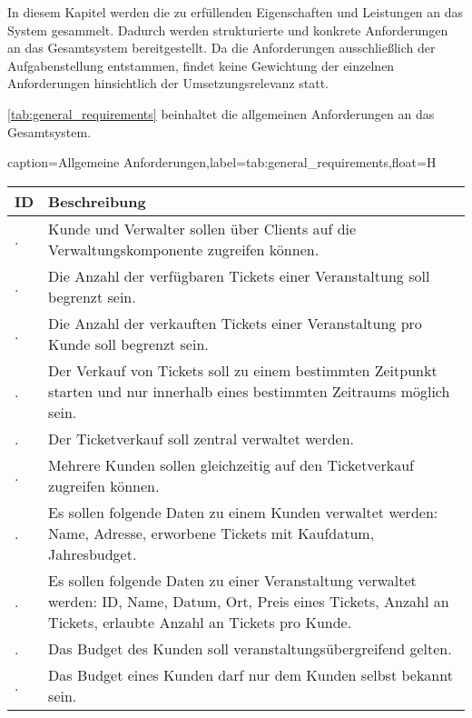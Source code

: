 In diesem Kapitel werden die zu erfüllenden Eigenschaften und Leistungen an das System gesammelt. 
Dadurch werden strukturierte und konkrete Anforderungen an das Gesamtsystem bereitgestellt.
Da die Anforderungen ausschließlich der Aufgabenstellung entstammen, findet keine Gewichtung der einzelnen Anforderungen hinsichtlich der Umsetzungsrelevanz statt.

\autoref{tab:general_requirements} beinhaltet die allgemeinen Anforderungen an das Gesamtsystem.

\newcommand\inctablenumber{\stepcounter{tablenumber}}
\newcommand\tablenumber{\arabic{tablenumber}}
\newcommand\incrownumber{\stepcounter{rownumber}}
\newcommand\rownumber{\arabic{rownumber}}
\setcounter{tablenumber}{1}
\setcounter{rownumber}{1}
\begin{dhbwtable}{caption={Allgemeine Anforderungen},label=tab:general_requirements,float=H}
    \begin{tabularx}{\textwidth}{l | X}
        \toprule
        \textbf{ID} & \textbf{Beschreibung}  \\\midrule
        \tablenumber .\rownumber & Kunde und Verwalter sollen über Clients auf die Verwaltungskomponente zugreifen können. \\\midrule\incrownumber
        \tablenumber .\rownumber & Die Anzahl der verfügbaren Tickets einer Veranstaltung soll begrenzt sein. \\\midrule\incrownumber
        \tablenumber .\rownumber & Die Anzahl der verkauften Tickets einer Veranstaltung pro Kunde soll begrenzt sein. \\\midrule\incrownumber
        \tablenumber .\rownumber & Der Verkauf von Tickets soll zu einem bestimmten Zeitpunkt starten und nur innerhalb eines bestimmten Zeitraums möglich sein. \\\midrule\incrownumber
        \tablenumber .\rownumber & Der Ticketverkauf soll zentral verwaltet werden. \\\midrule\incrownumber
        \tablenumber .\rownumber & Mehrere Kunden sollen gleichzeitig auf den Ticketverkauf zugreifen können. \\\midrule\incrownumber
        \tablenumber .\rownumber & Es sollen folgende Daten zu einem Kunden verwaltet werden: Name, Adresse, erworbene Tickets mit Kaufdatum, Jahresbudget. \\\midrule\incrownumber
        \tablenumber .\rownumber & Es sollen folgende Daten zu einer Veranstaltung verwaltet werden: ID, Name, Datum, Ort, Preis eines Tickets, Anzahl an Tickets, erlaubte Anzahl an Tickets pro Kunde. \\\midrule\incrownumber
        \tablenumber .\rownumber & Das Budget des Kunden soll veranstaltungsübergreifend gelten. \\\midrule\incrownumber
        \tablenumber .\rownumber & Das Budget eines Kunden darf nur dem Kunden selbst bekannt sein.  \\\bottomrule
    \end{tabularx}    
\end{dhbwtable}

